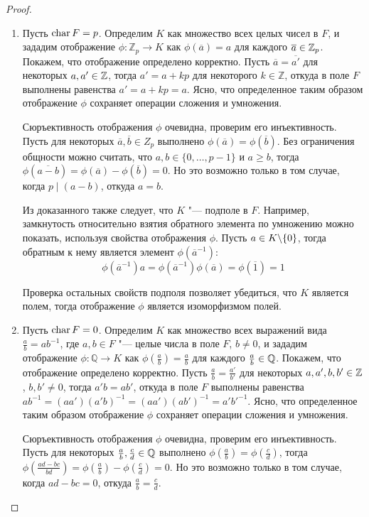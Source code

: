 \begin{proof}~
	\begin{enumerate}
		\item Пусть $\operatorname{char}{F} = p$. Определим $K$ как множество всех целых чисел в $F$, и зададим отображение $\phi: \mathbb{Z}_p \rightarrow K$ как $\phi(\overline{a}) = a$ для каждого $\overline{a} \in \mathbb{Z}_p$. Покажем, что отображение определено корректно. Пусть $\overline{a} = \overline{a'}$ для некоторых $a, a' \in \mathbb{Z}$, тогда $a' = a + kp$ для некоторого $k \in \mathbb{Z}$, откуда в поле $F$ выполнены равенства $a' = a + kp = a$. Ясно, что определенное таким образом отображение $\phi$ сохраняет операции сложения и умножения.
		
		Сюръективность отображения $\phi$ очевидна, проверим его инъективность. Пусть для некоторых $\overline{a}, \overline{b} \in Z_p$ выполнено $\phi(\overline{a}) = \phi(\overline{b})$. Без ограничения общности можно считать, что $a, b \in \{0,\dots, p-1\}$ и $a \ge b$, тогда $\phi(\overline{a - b}) = \phi(\overline{a}) - \phi(\overline{b}) = 0$. Но это возможно только в том случае, когда $p \mid (a - b)$, откуда $a = b$.
		
		Из доказанного также следует, что $K$ "--- подполе в $F$. Например, замкнутость относительно взятия обратного элемента по умножению можно показать, используя свойства отображения $\phi$. Пусть $a \in K \backslash \{0\}$, тогда обратным к нему является элемент $\phi(\overline{a}^{-1})$:
		\[\phi(\overline{a}^{-1}) a = \phi(\overline{a}^{-1})\phi(\overline{a}) = \phi(\overline{1}) = 1\]
		
		Проверка остальных свойств подполя позволяет убедиться, что $K$ является полем, тогда отображение $\phi$ является изоморфизмом полей.
	
		\item Пусть $\operatorname{char}{F} = 0$. Определим $K$ как множество всех выражений вида $\frac ab = ab^{-1}$, где $a, b \in F$ "--- целые числа в поле $F$, $b \ne 0$, и зададим отображение $\phi: \mathbb{Q} \rightarrow K$ как $\phi(\frac{a}{b}) = \frac ab$ для каждого $\frac ab \in \mathbb{Q}$. Покажем, что отображение определено корректно. Пусть $\frac{a}{b} = \frac{a'}{b'}$ для некоторых $a, a', b, b' \in \mathbb{Z}$, $b, b' \ne 0$, тогда $a'b = ab'$, откуда в поле $F$ выполнены равенства $ab^{-1} = (aa')(a'b)^{-1} = (aa')(ab')^{-1} = a'b'^{-1}$. Ясно, что определенное таким образом отображение $\phi$ сохраняет операции сложения и умножения.
		
		Сюръективность отображения $\phi$ очевидна, проверим его инъективность. Пусть для некоторых $\frac ab, \frac cd \in \mathbb{Q}$ выполнено $\phi(\frac ab) = \phi(\frac cd)$, тогда $\phi(\frac{ad - bc}{bd}) = \phi(\frac ab) - \phi(\frac cd) = 0$. Но это возможно только в том случае, когда ${ad - bc} = 0$, откуда $\frac ab = \frac cd$.
		

\end{enumerate}
\end{proof}
